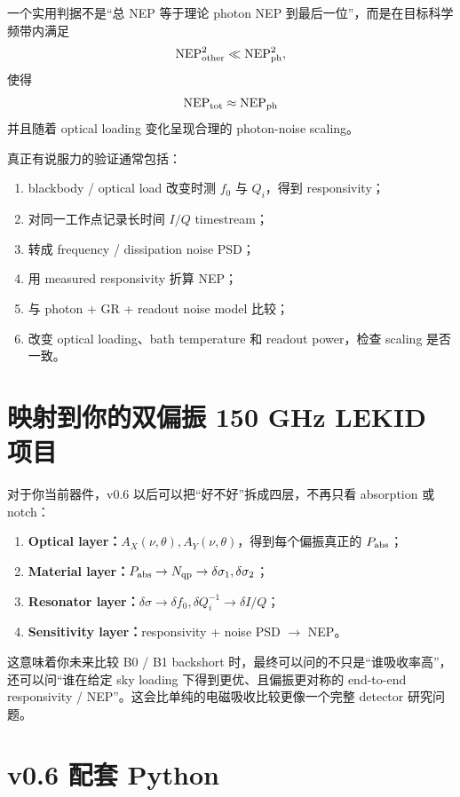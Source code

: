 \documentclass[11pt,a4paper,openany]{ctexrep}
\begin{document}
一个实用判据不是“总 NEP 等于理论 photon NEP 到最后一位”，而是在目标科学频带内满足
\[
\mathrm{NEP}_{\rm other}^2
\ll
\mathrm{NEP}_{\rm ph}^2,
\]
使得
\[
\mathrm{NEP}_{\rm tot}
\approx
\mathrm{NEP}_{\rm ph}
\]
并且随着 optical loading 变化呈现合理的 photon-noise scaling。

真正有说服力的验证通常包括：
\begin{enumerate}
  \item blackbody / optical load 改变时测 $f_0$ 与 $Q_i$，得到 responsivity；
  \item 对同一工作点记录长时间 $I/Q$ timestream；
  \item 转成 frequency / dissipation noise PSD；
  \item 用 measured responsivity 折算 NEP；
  \item 与 photon + GR + readout noise model 比较；
  \item 改变 optical loading、bath temperature 和 readout power，检查 scaling 是否一致。
\end{enumerate}

\section{映射到你的双偏振 150 GHz LEKID 项目}

\begin{projectbox}
对于你当前器件，v0.6 以后可以把“好不好”拆成四层，不再只看 absorption 或 notch：
\begin{enumerate}
  \item \textbf{Optical layer：}$A_X(\nu,\theta),A_Y(\nu,\theta)$，得到每个偏振真正的 $P_{\rm abs}$；
  \item \textbf{Material layer：}$P_{\rm abs}\rightarrow N_{\rm qp}\rightarrow\delta\sigma_1,\delta\sigma_2$；
  \item \textbf{Resonator layer：}$\delta\sigma\rightarrow\delta f_0,\delta Q_i^{-1}\rightarrow\delta I/Q$；
  \item \textbf{Sensitivity layer：}responsivity + noise PSD $\rightarrow$ NEP。
\end{enumerate}
这意味着你未来比较 B0 / B1 backshort 时，最终可以问的不只是“谁吸收率高”，还可以问“谁在给定 sky loading 下得到更优、且偏振更对称的 end-to-end responsivity / NEP”。这会比单纯的电磁吸收比较更像一个完整 detector 研究问题。
\end{projectbox}

\section{v0.6 配套 Python}
\end{document}
